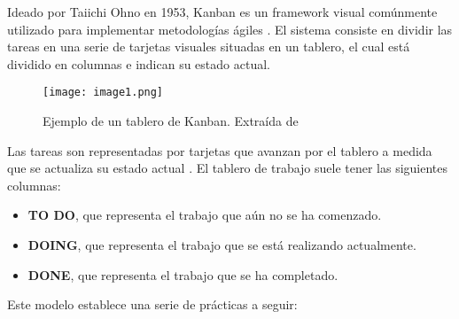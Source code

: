 \par Ideado por Taiichi Ohno en 1953, Kanban es un framework visual comúnmente utilizado para implementar metodologías ágiles \cite{tettehEmpiricalStudyAgile2024,montegalianoImplantarScrumCon2016}. El sistema consiste en dividir las tareas en una serie de tarjetas visuales situadas en un tablero, el cual está dividido en columnas e indican su estado actual. 
\begin{figure}[H]
  \centering
  \texttt{[image: image1.png]}
  \caption{Ejemplo de un tablero de Kanban. Extraída de \cite{montegalianoImplantarScrumCon2016}}
  \label{fig:x Tablero kanban}
\end{figure}
\par Las tareas son representadas por tarjetas que avanzan por el tablero a medida que se actualiza su estado actual \cite{montegalianoImplantarScrumCon2016,canosaferreiroSCRUMTeoriaImplementacion2024}. El tablero de trabajo suele tener las siguientes columnas:
\begin{itemize}
    \item \textbf{TO DO}, que representa el trabajo que aún no se ha comenzado.
    \item \textbf{DOING}, que representa el trabajo que se está realizando actualmente.
    \item \textbf{DONE}, que representa el trabajo que se ha completado.
\end{itemize}
\par Este modelo establece una serie de prácticas a seguir:
